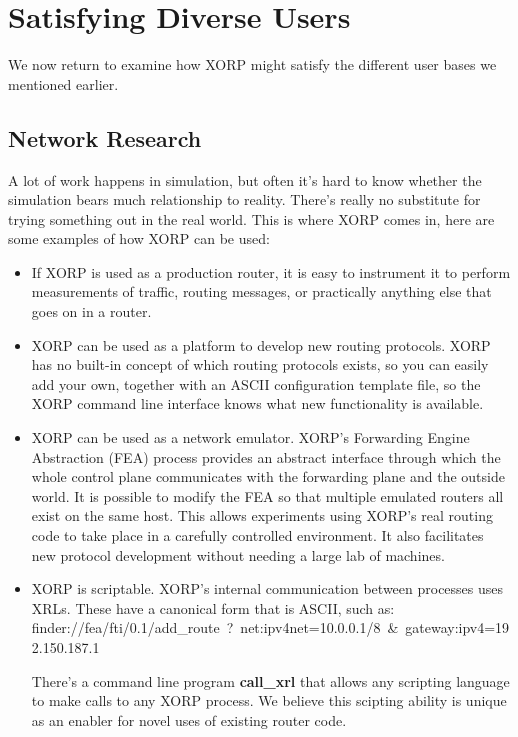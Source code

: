\section{Satisfying Diverse Users}

We now return to examine how XORP might satisfy the different user
bases we mentioned earlier.

\subsection{Network Research}

A lot of work happens in simulation,
but often it's hard to know whether the simulation bears much
relationship to reality.  There's really no substitute for trying
something out in the real world.  This is where XORP comes in, here are some examples of how XORP can be used:
\vspace{-0.07in}
\begin{itemize}
\item If XORP is used as a production router, it is easy to instrument
it to perform measurements of traffic, routing messages, or
practically anything else that goes on in a router.  
\vspace{-0.07in}
\item XORP can be used as a platform to develop new routing protocols.
XORP has no built-in concept of which routing protocols exists, so you
can easily add your own, together with an ASCII configuration template
file, so the XORP command line interface knows what new
functionality is available.
\vspace{-0.07in}
\item XORP can be used as a network emulator.
XORP's Forwarding Engine Abstraction (FEA) process provides an
abstract interface through which the whole control plane communicates
with the forwarding plane and the outside world.  It is possible to
modify the FEA so that multiple emulated routers all exist on the same
host.  This allows experiments using XORP's real routing code to take
place in a carefully controlled environment.  It also facilitates new
protocol development without needing a large lab of machines.
\vspace{-0.07in}
\item XORP is scriptable.  XORP's internal communication between
processes uses XRLs.
These have a canonical form that is ASCII, such as:\\
{\sf finder://fea/fti/0.1/add\_route~?~net:ipv4net=10.0.0.1/8~\&~gateway:ipv4=192.150.187.1}

There's a command line program \textbf{call\_xrl} that
allows any scripting language to make calls to any XORP process.  We
believe this scipting ability is unique as an enabler for novel uses of
existing router code.
\end{itemize}

